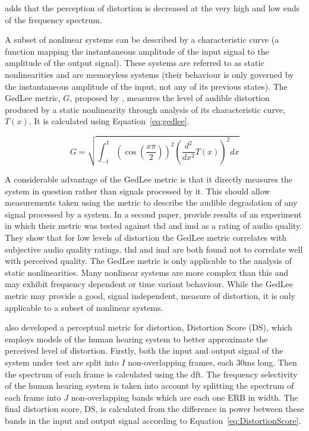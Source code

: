 			\citet{voishvillo2006assessment} adds that the perception of distortion is decreased at the very
			high and low ends of the frequency spectrum.

			A subset of nonlinear systems can be described by a characteristic curve (a function mapping the
			instantaneous amplitude of the input signal to the amplitude of the output signal). These systems
			are referred to as static nonlinearities and are memoryless systems (their behaviour is only
			governed by the instantaneous amplitude of the input, not any of its previous states). The GedLee
			metric, $G$, proposed by \citet{geddes2003auditory}, measures the level of audible distortion
			produced by a static nonlinearity through analysis of its characteristic curve, $T(x)$. It is
			calculated using Equation~\ref{eq:gedlee}.

			\begin{equation}
				G = \sqrt{\int_{-1}^{1} \left( \cos \left( \frac{x\pi}{2} \right) \right)^{2}
					      \left( \frac{d^{2}}{dx^{2}} T(x) \right)^{2} dx}
				\label{eq:gedlee}
			\end{equation}

			A considerable advantage of the GedLee metric is that it directly measures the system in question
			rather than signals processed by it. This should allow measurements taken using the metric to
			describe the audible degradation of any signal processed by a system. In a second paper,
			\citet{lee2003auditory} provide results of an experiment in which their metric was tested against
			\acrshort{thd} and \acrshort{imd} as a rating of audio quality. They show that for low levels of
			distortion the GedLee metric correlates with subjective audio quality ratings. \acrshort{thd} and
			\acrshort{imd} are both found not to correlate well with perceived quality. The GedLee metric is
			only applicable to the analysis of static nonlinearities. Many nonlinear systems are more complex
			than this and may exhibit frequency dependent or time variant behaviour. While the GedLee metric
			may provide a good, signal independent, measure of distortion, it is only applicable to a subset of
			nonlinear systems.

			\citet{tan2003the} also developed a perceptual metric for distortion, Distortion Score
			($\mathrm{DS}$), which employs models of the human hearing system to better approximate the
			perceived level of distortion. Firstly, both the input and output signal of the system under test
			are split into $I$ non-overlapping frames, each 30ms long. Then the spectrum of each frame is
			calculated using the \acrshort{dft}. The frequency selectivity of the human hearing system is taken
			into account by splitting the spectrum of each frame into $J$ non-overlapping bands which are each
			one $\mathrm{ERB}$ in width. The final distortion score, $\mathrm{DS}$, is calculated from the
			difference in power between these bands in the input and output signal according to
			Equation~\ref{eq:DistortionScore}.

